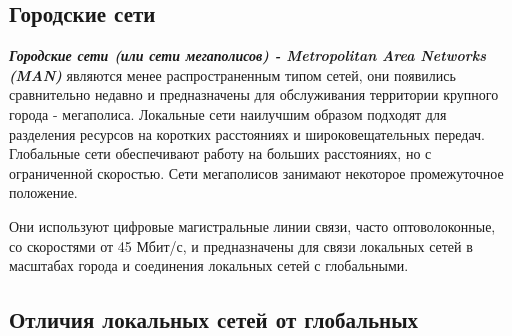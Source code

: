 \subsection{Городские сети}

\textbf{\textit{Городские сети (или сети мегаполисов) - Metropolitan Area Networks (MAN)}} являются менее распространенным типом сетей, они появились сравнительно недавно и предназначены для обслуживания территории крупного города - мегаполиса.
Локальные сети наилучшим образом подходят для разделения ресурсов на коротких расстояниях и широковещательных передач.
Глобальные сети обеспечивают работу на больших расстояниях, но с ограниченной скоростью.
Сети мегаполисов занимают некоторое промежуточное положение.

Они используют цифровые магистральные линии связи, часто оптоволоконные, со скоростями от 45 Мбит/с, и предназначены для связи локальных сетей в масштабах города и соединения локальных сетей с глобальными.

\subsection{Отличия локальных сетей от глобальных}

